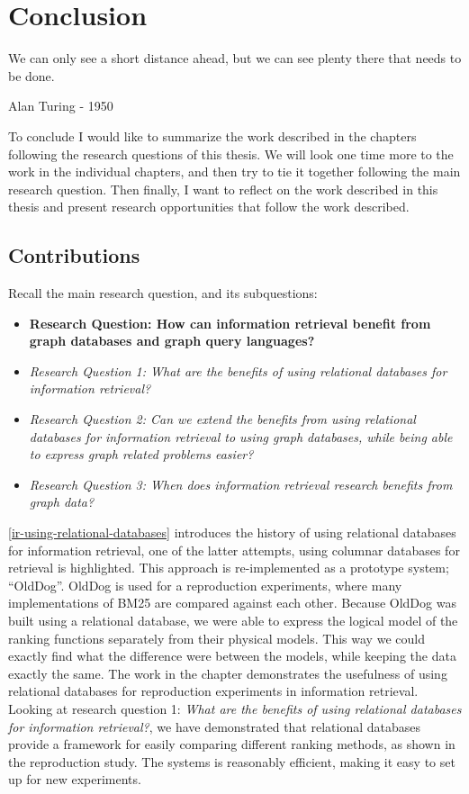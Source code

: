 \chapter{Conclusion}
\label{conclusion}
\epigraph{We can only see a short distance ahead, but we can see plenty there that needs to be done.}{Alan Turing - 1950}

To conclude I would like to summarize the work described in the chapters following the research questions of this thesis. We will look one time more to the work in the individual chapters, and then try to tie it together following the main research question. Then finally, I want to reflect on the work described in this thesis and present research opportunities that follow the work described. 

\section{Contributions}
Recall the main research question, and its subquestions:
\begin{itemize}
	\item \textbf{Research Question: How can information retrieval benefit from graph databases and graph query languages?}
	\item \emph{Research Question 1: What are the benefits of using relational databases for information retrieval?} 
	\item \emph{Research Question 2: Can we extend the benefits from using relational databases for information retrieval to using graph databases, while being able to express graph related problems easier?} 
	\item \emph{Research Question 3: When does information retrieval research benefits from graph data?} 
\end{itemize}

\cref{ir-using-relational-databases} introduces the history of using relational databases for information retrieval, one of the latter attempts, using columnar databases for retrieval is highlighted. This approach is re-implemented as a prototype system; ``OldDog''. OldDog is used for a reproduction experiments, where many implementations of BM25 are compared against each other. Because OldDog was built using a relational database, we were able to express the logical model of the ranking functions separately from their physical models. This way we could exactly find what the difference were between the models, while keeping the data exactly the same. The work in the chapter demonstrates the usefulness of using relational databases for reproduction experiments in information retrieval. Looking at research question 1: \emph{What are the benefits of using relational databases for information retrieval?}, we have demonstrated that relational databases provide a framework for easily comparing different ranking methods, as shown in the reproduction study. The systems is reasonably efficient, making it easy to set up for new experiments. 

